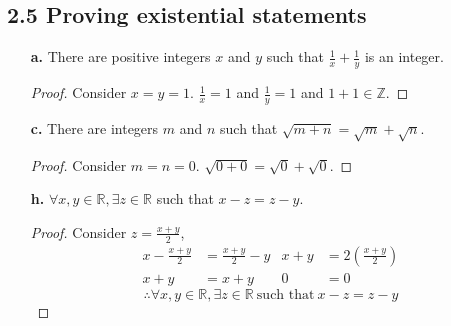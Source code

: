 \documentclass{article}
\newcommand{\bld}{\textbf}
\begin{document}
\subsection*{2.5 Proving existential statements}
\begin{enumerate}
  \item[\bld{a.}] There are positive integers $x$ and $y$ such that $\frac{1}{x} + \frac{1}{y}$ is an integer.
    \begin{proof}
      Consider $x=y=1$. $\frac{1}{x} = 1$ and $\frac{1}{y} = 1$ and $1+1 \in \mathbb{Z}$.
    \end{proof}
  \item[\bld{c.}] There are integers $m$ and $n$ such that $\sqrt{m+n} = \sqrt{m} + \sqrt{n}$.
    \begin{proof}
      Consider $m=n=0$. $\sqrt{0+0} = \sqrt{0} + \sqrt{0}$.
    \end{proof}
  \item[\bld{h.}] $\forall x,y \in \mathbb{R}, \exists z \in \mathbb{R}$ such that $x-z=z-y$.
    \begin{proof}
      Consider $z=\frac{x+y}{2}$,
      \begin{align*}
        x - \frac{x+y}{2} & = \frac{x+y}{2} - y & x +y & = 2\left(\frac{x+y}{2}\right) \\
        x + y             & = x+y               & 0    & = 0
      \end{align*}
      \[
        \therefore \forall x,y \in \mathbb{R}, \exists z \in \mathbb{R}~\text{such that}~x-z=z-y
      \]
    \end{proof}
\end{enumerate}
\end{document}
